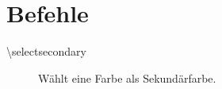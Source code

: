 \documentclass{scrartcl}
\begin{document}
\section{Befehle}

\begin{description}
  \item[\ttfamily\mdseries\textbackslash selectsecondary]
    Wählt eine Farbe als Sekundärfarbe.
\end{description}
\end{document}

